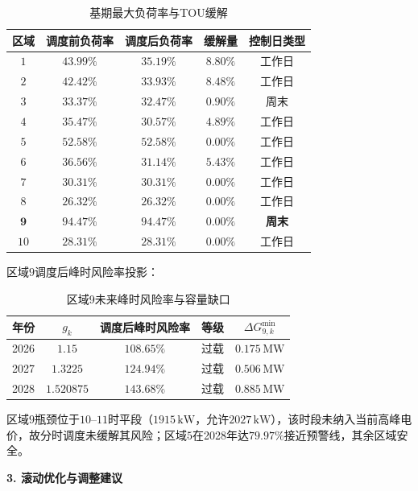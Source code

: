 \documentclass[a4paper,12pt]{ctexart}
\begin{document}
\begin{table}[H]
\centering
\caption{基期最大负荷率与TOU缓解}
\begin{tabular}{ccccc}
\toprule
区域 & 调度前负荷率 & 调度后负荷率 & 缓解量 & 控制日类型 \\
\midrule
$1$ & $43.99\%$ & $35.19\%$ & $8.80\%$ & 工作日 \\
$2$ & $42.42\%$ & $33.93\%$ & $8.48\%$ & 工作日 \\
$3$ & $33.37\%$ & $32.47\%$ & $0.90\%$ & 周末 \\
$4$ & $35.47\%$ & $30.57\%$ & $4.89\%$ & 工作日 \\
$5$ & $52.58\%$ & $52.58\%$ & $0.00\%$ & 工作日 \\
$6$ & $36.56\%$ & $31.14\%$ & $5.43\%$ & 工作日 \\
$7$ & $30.31\%$ & $30.31\%$ & $0.00\%$ & 工作日 \\
$8$ & $26.32\%$ & $26.32\%$ & $0.00\%$ & 工作日 \\
$\mathbf{9}$ & $\mathbf{94.47\%}$ & $\mathbf{94.47\%}$ & $\mathbf{0.00\%}$ & \textbf{周末} \\
$10$ & $28.31\%$ & $28.31\%$ & $0.00\%$ & 工作日 \\
\bottomrule
\end{tabular}
\end{table}

区域$9$调度后峰时风险率投影：

\begin{table}[H]
\centering
\caption{区域9未来峰时风险率与容量缺口}
\begin{tabular}{ccccc}
\toprule
年份 & $g_{k}$ & 调度后峰时风险率 & 等级 & $\Delta G_{9,k}^{\min}$ \\
\midrule
2026 & $1.15$ & $108.65\%$ & 过载 & $0.175\,\mathrm{MW}$ \\
2027 & $1.3225$ & $124.94\%$ & 过载 & $0.506\,\mathrm{MW}$ \\
2028 & $1.520875$ & $143.68\%$ & 过载 & $0.885\,\mathrm{MW}$ \\
\bottomrule
\end{tabular}
\end{table}

区域$9$瓶颈位于$10\text{--}11$时平段（$1915\,\mathrm{kW}$，允许$2027\,\mathrm{kW}$），该时段未纳入当前高峰电价，故分时调度未缓解其风险；区域$5$在2028年达$79.97\%$接近预警线，其余区域安全。


\textbf{3. 滚动优化与调整建议}
\end{document}
